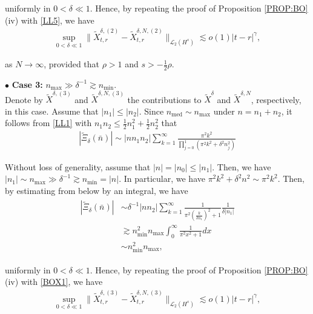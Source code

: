 \documentclass[letterpaper, 11pt,  reqno]{amsart}
\DeclareMathOperator{\med}{med}
\newcommand{\1}{\hspace{0.5mm}\text{I}\hspace{0.5mm}}
\newcommand{\noi}{\noindent}
\newcommand{\bul}{\bullet}
\newcommand{\dl}{\delta}
\newcommand{\g}{\gamma}
\newcommand{\wt}{\widetilde}
\newcommand{\les}{\lesssim}
\newcommand{\ges}{\gtrsim}
\newcommand{\cL}{\mathcal{L}}
\numberwithin{equation}{section}
\numberwithin{theorem}{section}
\begin{document}
\noi
uniformly in $0 < \dl \ll 1$.
Hence, by repeating the proof of Proposition 
\ref{PROP:BO}\,(iv) with \eqref{LL5}, we have 
\begin{align}
\sup_{0 < \dl \ll 1} \|  \wt X^{\dl, (2)}_{t,r} - \wt X^{\dl,N, (2)}_{t,r} \|_{\cL_2 (H^s)}
\les
 o(1) |t-r|^\g, 
\label{LL6}
\end{align}


\noi
as $N \to \infty$, 
provided that 
 $\rho > 1$ and $s > -\frac 12\rho$.


\medskip

\noi
$\bul$ {\bf Case 3:} $n_{\max} \gg    \dl^{-1} \ges  n_{\min}$.\\
\indent
Denote by 
 $\wt X^{\dl, (3)}$ and $ \wt X^{\dl,N, (3)}$
the contributions to 
$\wt X^\dl$ and $\wt X^{\dl,N}$, respectively, in this case.
Assume that $|n_1|\le |n_2|$.
Since $n_{\med} \sim n_{\max}$ under $n = n_1 + n_2$, 
it follows from 
 \eqref{LL1} with $n_1 n_2 \le \frac 12 n_1^2 + \frac 12 n_2^2$ that 
\begin{align*}
|\wt \Xi_\dl(\bar n)|
\sim |n n_1 n_2|
 \sum_{k=1}^{\infty}   
 \frac{ \pi^2 k^2 }
 {\prod_{j = 0}^1(\pi^2k^2  +\dl^2n_j^2)}
\end{align*}

\noi
Without loss of generality, assume that $|n| = |n_0| \le |n_1|$.
Then, we have $|n_1| \sim n_{\max}
\gg \dl^{-1} \ges n_{\min} = |n|$. 
In particular, we have 
$\pi^2k^2  +\dl^2n^2 \sim \pi^2 k^2$.
Then, by  estimating from below by an integral, we have 
\begin{align}
\begin{split}
|\wt \Xi_\dl(\bar n)|
& \sim \dl^{-1} |n  n_2|
 \sum_{k=1}^{\infty}   
 \frac{ 1}
 {\pi^2(\frac k{\dl n_1})^2  +1} \frac{1}{\dl |n_1|}\\
 & \ges  n_{\min}^2n_{\max}
\int_{0}^\infty
 \frac{ 1}
 {\pi^2x^2 +1}dx\\
& \sim   n_{\min}^2n_{\max}, 
\end{split}
\label{BOX1}
\end{align}

\noi
uniformly in $0 < \dl \ll 1$.
Hence, by repeating the proof of Proposition 
\ref{PROP:BO}\,(iv) with \eqref{BOX1}, we have 
\begin{align}
\sup_{0 < \dl \ll 1} \|  \wt X^{\dl, (3)}_{t,r} - \wt X^{\dl,N, (3)}_{t,r} \|_{\cL_2 (H^s)}
\les
 o(1) |t-r|^\g, 
\label{LL9}
\end{align}
\end{document}
